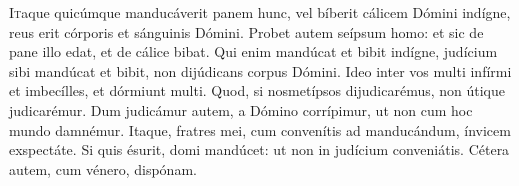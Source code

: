 
\lettrine{I}{t}aque quicúmque manducáverit panem hunc, vel bíberit cálicem Dómini indígne, reus erit córporis et sánguinis Dómini. 
Probet autem seípsum homo: et sic de pane illo edat, et de cálice bibat. 
Qui enim mandúcat et bibit indígne, judícium sibi mandúcat et bibit, non dijúdicans corpus Dómini. 
Ideo inter vos multi infírmi et imbecílles, et dórmiunt multi. 
Quod, si nosmetípsos dijudicarémus, non útique judicarémur. 
Dum judicámur autem, a Dómino corrípimur, ut non cum hoc mundo damnémur. 
Itaque, fratres mei, cum convenítis ad manducándum, ínvicem exspectáte. 
Si quis ésurit, domi mandúcet: ut non in judícium conveniátis. Cétera autem, cum vénero, dispónam.
